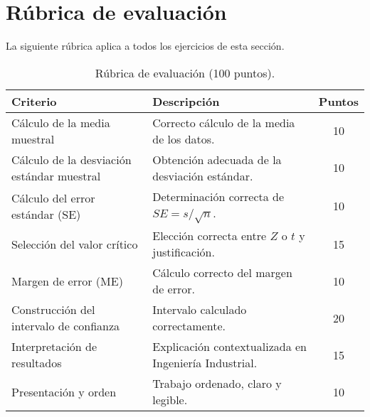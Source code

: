 \section{Rúbrica de evaluación}
La siguiente rúbrica aplica a todos los ejercicios de esta sección.

\begin{table}[H]
\centering
\begin{tabular}{p{} p{} c}
\toprule
\textbf{Criterio} & \textbf{Descripción} & \textbf{Puntos}\\
\midrule
Cálculo de la media muestral & Correcto cálculo de la media de los datos. & 10\\
Cálculo de la desviación estándar muestral & Obtención adecuada de la desviación estándar. & 10\\
Cálculo del error estándar (SE) & Determinación correcta de $SE = s/\sqrt{n}$. & 10\\
Selección del valor crítico & Elección correcta entre $Z$ o $t$ y justificación. & 15\\
Margen de error (ME) & Cálculo correcto del margen de error. & 10\\
Construcción del intervalo de confianza & Intervalo calculado correctamente. & 20\\
Interpretación de resultados & Explicación contextualizada en Ingeniería Industrial. & 15\\
Presentación y orden & Trabajo ordenado, claro y legible. & 10\\
\bottomrule
\end{tabular}
\caption{Rúbrica de evaluación (100 puntos).}
\end{table}